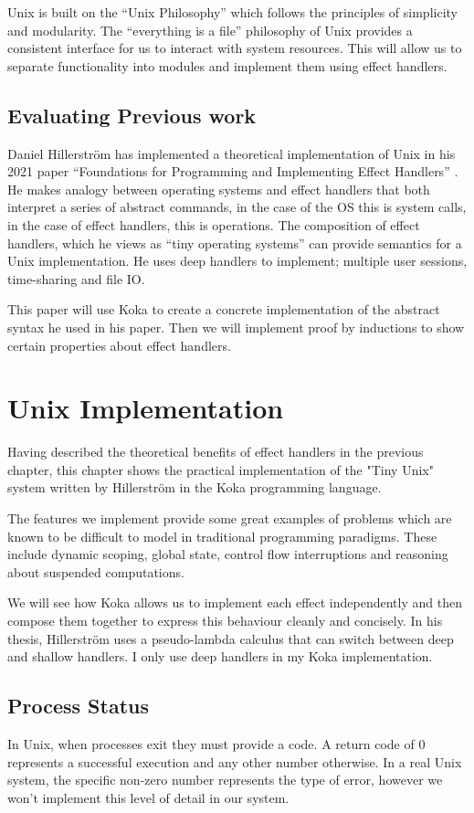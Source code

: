 \documentclass[logo,bsc,singlespacing,parskip]{infthesis}
\begin{document}
Unix is built on the “Unix Philosophy” which follows the principles of simplicity and modularity. The “everything is a file” philosophy of Unix provides a consistent interface for us to interact with system resources. This will allow us to separate functionality into modules and implement them using effect handlers.

\section{Evaluating Previous work}
Daniel Hillerström has implemented a theoretical implementation of Unix in his 2021 paper “Foundations for Programming and Implementing Effect Handlers” \cite{hillerstrom_foundations_nodate}. He makes analogy between operating systems and effect handlers that both interpret a series of abstract commands, in the case of the OS this is system calls, in the case of effect handlers, this is operations. The composition of effect handlers, which he views as “tiny operating systems” can provide semantics for a Unix implementation. He uses deep handlers to implement; multiple user sessions, time-sharing and file IO.

This paper will use Koka to create a concrete implementation of the abstract syntax he used in his paper. Then we will implement proof by inductions to show certain properties about effect handlers.

\chapter{Unix Implementation}
Having described the theoretical benefits of effect handlers in the previous chapter, this chapter shows the practical implementation of the "Tiny Unix" system written by Hillerström in the Koka programming language. 

The features we implement provide some great examples of problems which are known to be difficult to model in traditional programming paradigms.  These include dynamic scoping, global state, control flow interruptions and reasoning about suspended computations. 

We will see how Koka allows us to implement each effect independently and then compose them together to express this behaviour cleanly and concisely.
In his thesis, Hillerström uses a pseudo-lambda calculus that can switch between deep and shallow handlers. I only use deep handlers in my Koka implementation.



\section{Process Status}
In Unix, when processes exit they must provide a code. A return code of 0 represents a successful execution and any other number otherwise. In a real Unix system, the specific non-zero number represents the type of error, however we won't implement this level of detail in our system.
\end{document}
